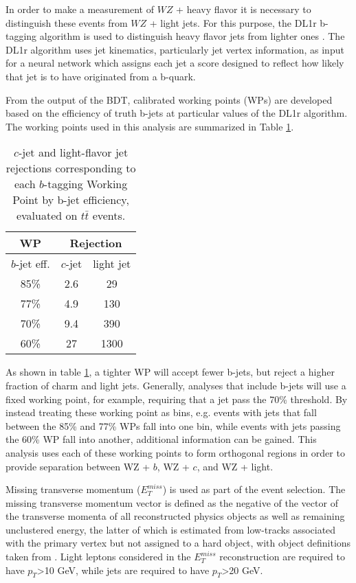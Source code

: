 In order to make a measurement of $WZ$ + heavy flavor it is necessary to distinguish these events from $WZ$ + light jets. For this purpose, the DL1r b-tagging algorithm is used to distinguish heavy flavor jets from lighter ones \cite{btagging}. The DL1r algorithm uses jet kinematics, particularly jet vertex information, as input for a neural network which assigns each jet a score designed to reflect how likely that jet is to have originated from a b-quark. 

From the output of the BDT, calibrated working points (WPs) are developed based on the efficiency of truth b-jets at particular values of the DL1r algorithm. The working points used in this analysis are summarized in Table \ref{tab:btag_WPs}. 

\begin{table}[H] 
\begin{center}
\begin{tabular}{|c|c|c|}
    \hline
    WP & \multicolumn{2}{c|}{Rejection}\\
    \hline
    $b$-jet eff. & $c$-jet & light jet\\
    \hline
    85\% & 2.6 & 29 \\
    77\% & 4.9 & 130 \\
    70\% & 9.4 & 390 \\
    60\% & 27 & 1300 \\ 
    \hline
    \end{tabular}    
    \caption{$c$-jet and light-flavor jet rejections corresponding to each $b$-tagging Working Point by b-jet efficiency, evaluated on $t\bar{t}$ events.}
    \label{tab:btag_WPs}
    \end{center}
\end{table}

As shown in table \ref{tab:btag_WPs}, a tighter WP will accept fewer b-jets, but reject a higher fraction of charm and light jets. Generally, analyses that include b-jets will use a fixed working point, for example, requiring that a jet pass the 70\% threshold. By instead treating these working point as bins, e.g. events with jets that fall between the 85\% and 77\% WPs fall into one bin, while events with jets passing the 60\% WP fall into another, additional information can be gained. This analysis uses each of these working points to form orthogonal regions in order to provide separation between WZ + $b$, WZ + $c$, and WZ + light. 

Missing transverse momentum ($E_T^{miss}$) is used as part of the event selection. The missing transverse momentum vector is defined as the negative of the vector of the transverse momenta of all reconstructed physics objects as well as remaining unclustered energy, the latter of which is estimated from low-\pt tracks associated with the primary vertex but not assigned to a hard object, with object definitions taken from \cite{met_2018}. Light leptons considered in the $E_T^{miss}$ reconstruction are required to have $p_T$>10 GeV, while jets are required to have $p_T$>20 GeV.

